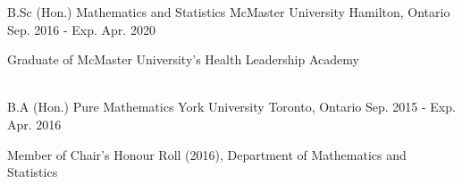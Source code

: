 
\begin{cventries}

  \cventry
    {B.Sc (Hon.) Mathematics and Statistics} %
    {McMaster University} %
    {Hamilton, Ontario} %
    {Sep. 2016 - Exp. Apr. 2020} %
    {
      \begin{cvitems} %
        \item {Graduate of McMaster University's Health Leadership Academy}
      \end{cvitems}
    }\\ \vspace{0.25cm}
    \cventry
    {B.A (Hon.) Pure Mathematics} %
    {York University} %
    {Toronto, Ontario} %
    {Sep. 2015 - Exp. Apr. 2016} %
    {
      \begin{cvitems} %
        \item {Member of Chair’s Honour Roll (2016), Department of Mathematics and Statistics}
      \end{cvitems}
    }
\end{cventries}
